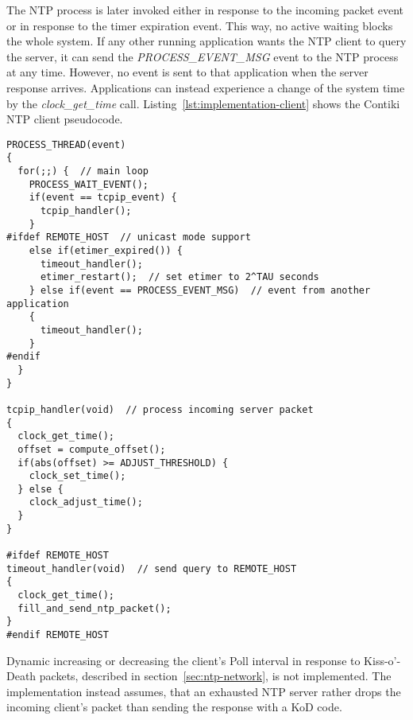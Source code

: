 The NTP process is later invoked either in response to the incoming packet event
or in response to the timer expiration event.
This way, no active waiting blocks the whole system.
If any other running application wants the NTP client to query the server,
it can send the {\it{PROCESS\_EVENT\_MSG}} event to the NTP process at any time.
However, no event is sent to that application when the server response arrives.
Applications can instead experience a change of
the system time by the {\it{clock\_get\_time}} call.
Listing~\ref{lst:implementation-client} shows the Contiki NTP client pseudocode.
\begin{lstlisting}[caption={NTP client pseudocode},label={lst:implementation-client}]
PROCESS_THREAD(event)
{
  for(;;) {  // main loop
    PROCESS_WAIT_EVENT();
    if(event == tcpip_event) {
      tcpip_handler();
    }
#ifdef REMOTE_HOST  // unicast mode support
    else if(etimer_expired()) {
      timeout_handler();
      etimer_restart();  // set etimer to 2^TAU seconds
    } else if(event == PROCESS_EVENT_MSG)  // event from another application
    {
      timeout_handler();
    }
#endif
  }
}

tcpip_handler(void)  // process incoming server packet
{
  clock_get_time();
  offset = compute_offset();
  if(abs(offset) >= ADJUST_THRESHOLD) {
    clock_set_time();
  } else {
    clock_adjust_time();
  }
}

#ifdef REMOTE_HOST
timeout_handler(void)  // send query to REMOTE_HOST
{
  clock_get_time();
  fill_and_send_ntp_packet();
}
#endif REMOTE_HOST
\end{lstlisting}


Dynamic increasing or decreasing the client's Poll interval in response to
Kiss-o'-Death packets, described in section~\ref{sec:ntp-network}, is not implemented.
The implementation instead assumes, that an exhausted NTP server rather drops the incoming
client's packet than sending the response with a KoD code.


